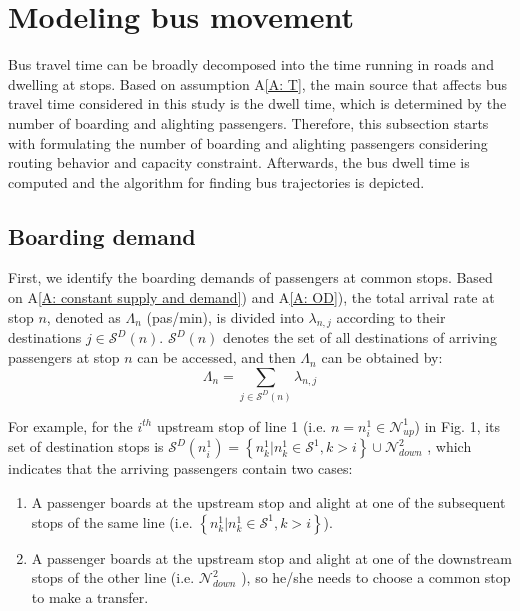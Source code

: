 \documentclass[smallextended]{svjour3}       %
\begin{document}
\begin{Abstract}
\begin{table}[H]
\begin{tabular}{p{1.5cm}p{7cm}p{1.1cm}}
\end{tabular}
\end{table}

\section{Modeling bus movement}\label{Bus movement}
Bus travel time can be broadly decomposed into the time running in roads and dwelling at stops. 
Based on assumption A\ref{A: T}, the main source that affects bus travel time considered in this study is the dwell time, which is determined by the number of boarding and alighting passengers. 
Therefore, this subsection starts with formulating the number of boarding and alighting passengers considering routing behavior and capacity constraint. Afterwards, the bus dwell time is computed and the algorithm for finding bus trajectories is depicted.

\subsection{Boarding demand}\label{B}
First, we identify the boarding demands of passengers at common stops.
Based on A\ref{A: constant supply and demand}) and A\ref{A: OD}), 
the total arrival rate at stop $n$, denoted as $\Lambda_{n}$ (pas/min), 
is divided into $\lambda_{n,j}$ 
according to their destinations $j\in \mathcal{S}^{D}(n)$.
$\mathcal{S}^{D}\left( n \right)$ denotes the set of all destinations of arriving passengers 
at stop $n$ can be accessed,
and then $\Lambda_{n}$ can be obtained by:
\begin{equation}
    \label{equ:sumLambda}
    \Lambda_{n} = \sum_{j \in \mathcal{S}^{D}\left( n \right)} \lambda_{n,j} 
\end{equation}

For example, for the $i^{th}$ upstream stop of line 1
(i.e. $n=n^{1}_{i} \in \mathcal{N}_{up}^{1}$) in \textup{Fig. 1}, 
its set of destination stops is 
$\mathcal{S}^{D}\left( n^{1}_{i} \right) = 
\left\{ n^{1}_{k}|n^{1}_{k} \in \mathcal{S}^{1},k > i \right\}
\cup \mathcal{N}_{down}^{2}$ , 
which indicates that the arriving passengers contain two cases:
\begin{enumerate}[1)]
    \item A passenger boards at the upstream stop and alight 
    at one of the subsequent stops of the same line 
    (i.e. $\left\{ n^{1}_{k}|n^{1}_{k} \in \mathcal{S}^{1},k > i \right\}$).
    \item A passenger boards at the upstream stop and alight at one of the downstream stops of the other line 
    (i.e. $\mathcal{N}_{down}^{2}$ ), 
    so he/she needs to choose a common stop to make a transfer.
\end{enumerate}


\end{Abstract}
\end{document}
